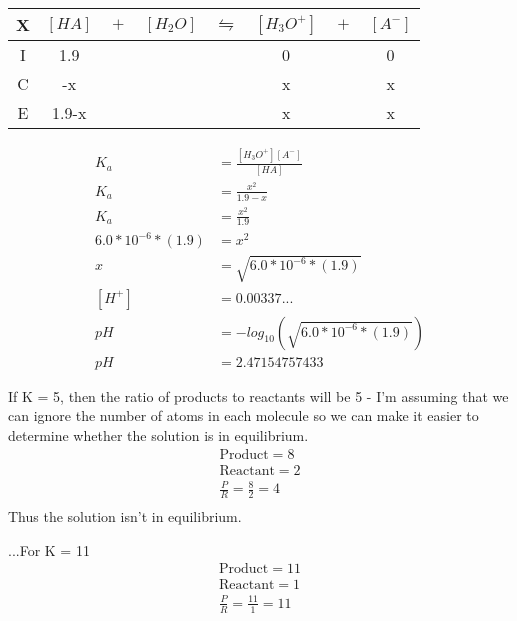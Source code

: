 \documentclass{article}  %
\begin{document}
\begin{tabular}{c|c@{}c@{}c@{}c@{}c@{}c@{}c}
    \hline
    X   & $[HA]$ & ${}+{}$ & $[H_2O]$ & ${}\leftrightharpoons{}$ & $[H_3O^+]$ & ${}+{}$ & $[A^-]$ \\
    \hline
    I   &  1.9    &&     &&  0   && 0  \\
    C   &   -x   &&     &&  x   &&  x \\
    E   &   1.9-x   &&     &&   x  && x  \\      
\end{tabular}

\begin{equation*}
    \begin{aligned}
        K_a &= \frac{[H_3O^+][A^-]}{[HA]} \\
        K_a &= \frac{x^2}{1.9-x} \\
        K_a &= \frac{x^2}{1.9} \\
        6.0*10^{-6}*(1.9) &= x^2 \\
        x &= \sqrt{6.0*10^{-6}*(1.9)} \\
        [H^+] &= 0.00337... \\
        pH &= -log_{10}\left(\sqrt{6.0*10^{-6}*(1.9)}\right) \\
        pH &= 2.47154757433
    \end{aligned}
\end{equation*}

If K = 5, then the ratio of products to reactants will be 5 - I'm assuming that we can ignore the number of atoms in each molecule so we can make it easier to determine whether the solution is in equilibrium.
\begin{equation*}
    \begin{aligned}
        \text{Product} = 8 \\
        \text{Reactant} = 2 \\
        \frac{P}{R} = \frac{8}{2} = 4 \\
    \end{aligned}
\end{equation*}
Thus the solution isn't in equilibrium.

...For K = 11
\begin{equation*}
    \begin{aligned}
        \text{Product} = 11 \\
        \text{Reactant} = 1 \\
        \frac{P}{R} = \frac{11}{1} = 11 \\
    \end{aligned}
\end{equation*}
\end{document}
